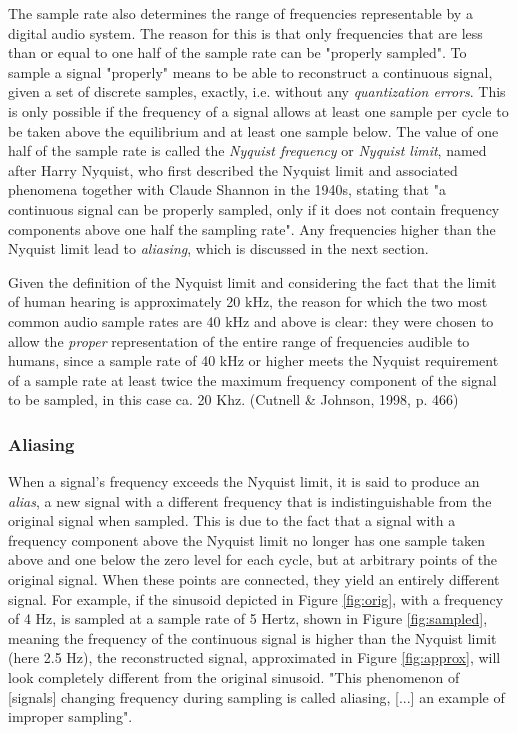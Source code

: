 The sample rate also determines the range of frequencies representable by a digital audio system. The reason for this is that only frequencies that are less than or equal to one half of the sample rate can be "properly sampled". To sample a signal "properly" means to be able to reconstruct a continuous signal, given a set of discrete samples, exactly, i.e. without any \emph{quantization errors}. This is only possible if the frequency of a signal allows at least one sample per cycle to be taken above the equilibrium and at least one sample below. The value of one half of the sample rate is called the \emph{Nyquist frequency} or \emph{Nyquist limit}, named after Harry Nyquist, who first described the Nyquist limit and associated phenomena together with Claude Shannon in the 1940s, stating that "a continuous signal can be properly sampled, only if it does not contain frequency components above one half the sampling rate". Any frequencies higher than the Nyquist limit lead to \emph{aliasing}, which is discussed in the next section.  \parbreak

Given the definition of the Nyquist limit and considering the fact that the limit of human hearing is approximately 20 kHz, the reason for which the two most common audio sample rates are 40 kHz and above is clear: they were chosen to allow the \emph{proper} representation of the entire range of frequencies audible to humans, since a sample rate of 40 kHz or higher meets the Nyquist requirement of a sample rate at least twice the maximum frequency component of the signal to be sampled, in this case ca. 20 Khz. (Cutnell \& Johnson, 1998, p. 466)

\subsubsection{Aliasing}

When a signal's frequency exceeds the Nyquist limit, it is said to produce an \emph{alias}, a new signal with a different frequency that is indistinguishable from the original signal when sampled. This is due to the fact that a signal with a frequency component above the Nyquist limit no longer has one sample taken above and one below the zero level for each cycle, but at arbitrary points of the original signal. When these points are connected, they yield an entirely different signal. For example, if the sinusoid depicted in Figure \ref{fig:orig}, with a frequency of 4 Hz, is sampled at a sample rate of 5 Hertz, shown in Figure \ref{fig:sampled}, meaning the frequency of the continuous signal is higher than the Nyquist limit (here 2.5 Hz), the reconstructed signal, approximated in Figure \ref{fig:approx}, will look completely different from the original sinusoid. "This phenomenon of [signals] changing frequency during sampling is called aliasing, [...] an example of improper sampling". 


